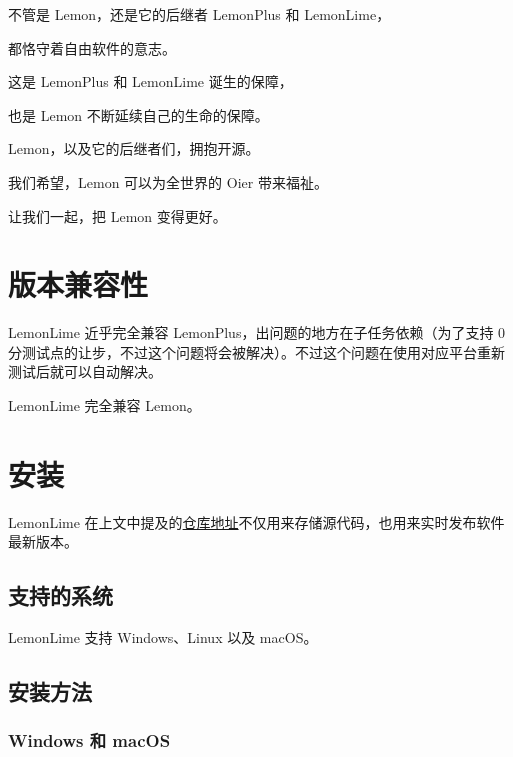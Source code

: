 \documentclass[UTF-8]{ctexart}
\begin{document}
		不管是 Lemon，还是它的后继者 LemonPlus 和 LemonLime，
		
		都恪守着自由软件的意志。
		
		这是 LemonPlus 和 LemonLime 诞生的保障，
		
		也是 Lemon 不断延续自己的生命的保障。\newline
		
		\begin{center}
			
		Lemon，以及它的后继者们，拥抱开源。
		
		我们希望，Lemon 可以为全世界的 Oier 带来福祉。
		
		让我们一起，把 Lemon 变得更好。
		
		\end{center}
	
	\newpage
	
	\section{版本兼容性}
	
		LemonLime 近乎完全兼容 LemonPlus，出问题的地方在子任务依赖（为了支持 0 分测试点的让步，不过这个问题将会被解决）。不过这个问题在使用对应平台重新测试后就可以自动解决。
		
		LemonLime 完全兼容 Lemon。
	
	\newpage
	
	\section{安装}
	
		LemonLime 在上文中提及的\href{https://github.com/iotang/Project_LemonLime}{仓库地址}不仅用来存储源代码，也用来实时发布软件最新版本。
		
		\subsection{支持的系统}
		
			LemonLime 支持 Windows、Linux 以及 macOS。
			
		\subsection{安装方法}
			
			\subsubsection{Windows 和 macOS}
			
\end{document}
